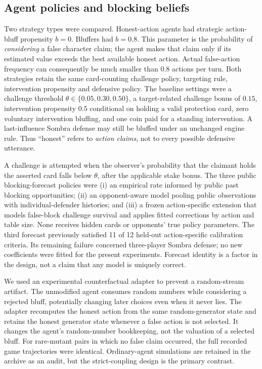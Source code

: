 \documentclass[11pt,a4paper]{article}
\begin{document}
\subsection{Agent policies and blocking beliefs}
Two strategy types were compared. Honest-action agents had strategic action-bluff propensity $b=0$. Bluffers had $b=0.8$. This parameter is the probability of \emph{considering} a false character claim; the agent makes that claim only if its estimated value exceeds the best available honest action. Actual false-action frequency can consequently be much smaller than $0.8$ actions per turn. Both strategies retain the same card-counting challenge policy, targeting rule, intervention propensity and defensive policy. The baseline settings were a challenge threshold $\theta\in\{0.05,0.30,0.50\}$, a target-related challenge bonus of $0.15$, intervention propensity $0.5$ conditional on holding a valid protection card, zero voluntary intervention bluffing, and one coin paid for a standing intervention. A last-influence Sombra defense may still be bluffed under an unchanged engine rule. Thus ``honest'' refers to \emph{action claims}, not to every possible defensive utterance.

A challenge is attempted when the observer's probability that the claimant holds the asserted card falls below $\theta$, after the applicable stake bonus. The three public blocking-forecast policies were (i) an empirical rate informed by public past blocking opportunities; (ii) an opponent-aware model pooling public observations with individual-defender histories; and (iii) a frozen action-specific extension that models false-block challenge survival and applies fitted corrections by action and table size. None receives hidden cards or opponents' true policy parameters. The third forecast previously satisfied 11 of 12 held-out action-specific calibration criteria. Its remaining failure concerned three-player Sombra defense; no new coefficients were fitted for the present experiments. Forecast identity is a factor in the design, not a claim that any model is uniquely correct.

We used an experimental counterfactual adapter to prevent a random-stream artifact. The unmodified agent consumes random numbers while considering a rejected bluff, potentially changing later choices even when it never lies. The adapter recomputes the honest action from the same random-generator state and retains the honest generator state whenever a false action is not selected. It changes the agent's random-number bookkeeping, not the valuation of a selected bluff. For rare-mutant pairs in which no false claim occurred, the full recorded game trajectories were identical. Ordinary-agent simulations are retained in the archive as an audit, but the strict-coupling design is the primary contrast.
\end{document}
